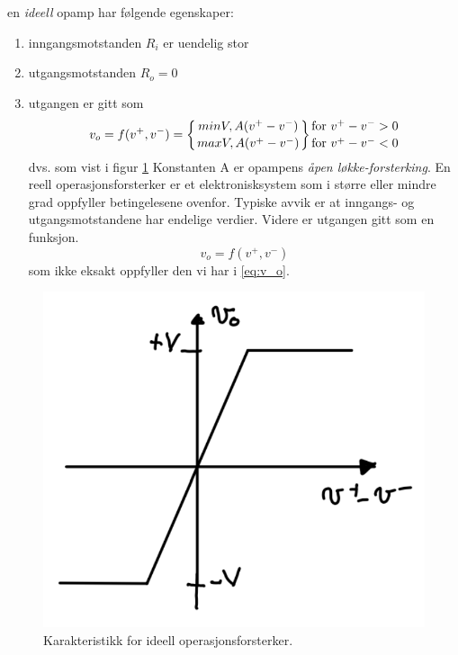 en \textit{ideell} opamp har følgende egenskaper:
\begin{enumerate}
    \item inngangsmotstanden $R_i$ er uendelig stor
    \item utgangsmotstanden $R_o = 0$
    \item utgangen er gitt som \newline \begin{equation} v_o=f(v^+,v^-) = \biggl\{ {{min{V,A(v^+-v^-)}} \atop {max{V,A(v^+-v^-)}}} \biggl\} {{\text{for } v^+-v^->0}\atop{\text{for } v^+-v^-<0}} \label{eq:v_o} \end{equation} \newline dvs. som vist i figur \ref{fig:02karakteristikk} Konstanten A er opampens \textit{åpen løkke-forsterking}. En reell operasjonsforsterker er et elektronisksystem som i større eller mindre grad oppfyller betingelesene ovenfor. Typiske avvik er at inngangs- og utgangsmotstandene har endelige verdier. Videre er utgangen gitt som en funksjon. \newline \begin{equation} v_o=f(v^+,v^-) \end{equation} \newline som ikke eksakt oppfyller den vi har i \ref{eq:v_o}.
\end{enumerate}
\begin{figure}[!hbt]
	\centering
	\includegraphics[scale=0.5]{./Images/01Issue/02_karakteristikk.png}
	\caption{ Karakteristikk for ideell operasjonsforsterker.}
	\label{fig:02karakteristikk}
\end{figure}


